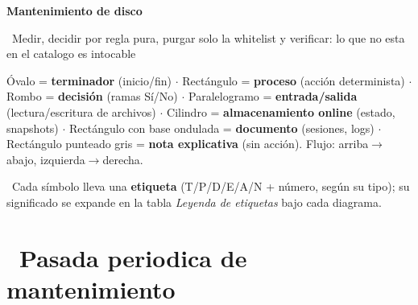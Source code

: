 \documentclass[11pt,a4paper]{article}
\newcommand{\iconotexto}[2]{\textcolor{cyanNeon}{\faIcon{#1}}~#2}
\newcommand{\bandaTitulo}[3][fondoOscuro]{%
  \noindent
  \begin{tcolorbox}[%
    enhanced, arc=4mm, colback=#1!10!white, colframe=#1, boxrule=0pt,
    borderline west={6pt}{0pt}{cyanNeon},
    top=6pt, bottom=6pt, left=8pt, right=8pt,
  ]
    \noindent
    \begin{minipage}[c]{0.10\linewidth}
      \centering\color{cyanNeon}\faIcon{hdd}
    \end{minipage}%
    \hspace{8pt}%
    \begin{minipage}[c]{0.88\linewidth}
      {\fontsize{20}{24}\selectfont\bfseries\color{white}#2}\par\vspace{5pt}%
      \textcolor{cyanNeon!80!white}{\small\faIcon{angle-right}~#3}%
    \end{minipage}
    \vspace{4pt}
  \end{tcolorbox}%
  \vspace{8pt}%
}
\begin{document}
\bandaTitulo{Mantenimiento de disco}{Medir, decidir por regla pura, purgar solo la whitelist y verificar: lo que no esta en el catalogo es intocable}

\vspace{4pt}
\begin{center}
\begin{tcolorbox}[cajaContenido, title={\faIcon{map-signs}~Leyenda de símbolos---ISO 5807 / ANSI X3.5}]
\small
Óvalo = \textbf{terminador} (inicio/fin) $\cdot$
Rectángulo = \textbf{proceso} (acción determinista) $\cdot$
Rombo = \textbf{decisión} (ramas Sí/No) $\cdot$
Paralelogramo = \textbf{entrada/salida} (lectura/escritura de archivos) $\cdot$
Cilindro = \textbf{almacenamiento online} (estado, snapshots) $\cdot$
Rectángulo con base ondulada = \textbf{documento} (sesiones, logs) $\cdot$
Rectángulo punteado gris = \textbf{nota explicativa} (sin acción).
Flujo: arriba$\rightarrow$abajo, izquierda$\rightarrow$derecha.

~Cada símbolo lleva una \textbf{etiqueta} (T/P/D/E/A/N + número, según su tipo);
su significado se expande en la tabla \emph{Leyenda de etiquetas} bajo cada diagrama.
\end{tcolorbox}
\end{center}

\vspace{6pt}

\section{\iconotexto{hdd}{Pasada periodica de mantenimiento}}
\end{document}
